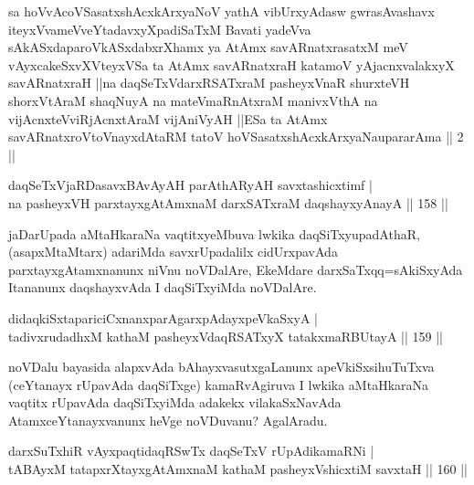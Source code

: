 
\begin{kandikeshl}
sa hoVvAcoVSasatxshAcxkArxyaNoV yathA vibUrxyAdasw gwrasAvashavx iteyxVvameVveYtadavxyXpadiSaTxM Bavati yadeVva sAkASxdaparoVkASxdabxrXhamx ya AtAmx savARnatxrasatxM meV vAyxcakeSxvXVteyxVSa ta AtAmx savARnatxraH katamoV yAjacnxvalakxyX savARnatxraH ||na daqSeTxVdarxRSATxraM pasheyxVnaR shurxteVH shorxVtAraM shaqNuyA na mateVmaRnAtxraM manivxVthA na vijAcnxteVviRjAcnxtAraM vijAniVyAH ||ESa ta AtAmx savARnatxroV\s toV\s nayxdAtaRM tatoV hoVSasatxshAcxkArxyaNa\break upararAma || 2 ||
\end{kandikeshl}


\begin{shl}
daqSeTxVjaRDasavxBAvAyAH parAthARyAH savxtashicxtimf |\\
na pasheyxVH parxtayxgAtAmxnaM darxSATxraM daqshayxyA\s nayA \hfill || 158 ||
\end{shl}

\begin{artha}
jaDarUpada aMtaHkaraNa vaqtitxyeMbuva lwkika daqSiTxyu\break padAthaR, (asapxMtaMtarx) adariMda savxrUpadalilx cidUrxpavAda parxtayxgAtamxnanunx niVnu noVDalAre, EkeMdare darxSaTxqq=sAkiSxyAda Itananunx daqshayxvAda I daqSiTxyiMda noVDalAre.
\end{artha}


\begin{shl}
didaqkiSxtapariciCxnanxparAgarxpAdayxpeVkaSxyA |\\
tadivxrudadhxM kathaM pasheyxVdaqRSATxyX tatakxmaRBUtayA \hfill || 159 ||
\end{shl}

\begin{artha}%
noVDalu bayasida alapxvAda bAhayxvasutxgaLanunx apeVkiSxsi\break huTuTxva (ceYtanayx rUpavAda daqSiTxge) kamaRvAgiruva I lwkika aMtaHkaraNa vaqtitx rUpavAda daqSiTxyiMda adakekx vilakaSxNavAda AtamxceYtanayxvanunx heVge noVDuvanu? AgalAradu.
\end{artha}

\begin{shl}
darxSuTxhiR vAyxpaqtidaqRSwTx daqSeTxV rUpAdikamaRNi |\\
tABAyxM tatapxrXtayxgAtAmxnaM kathaM pasheyxVshicxtiM savxtaH \hfill || 160 ||
\end{shl}

